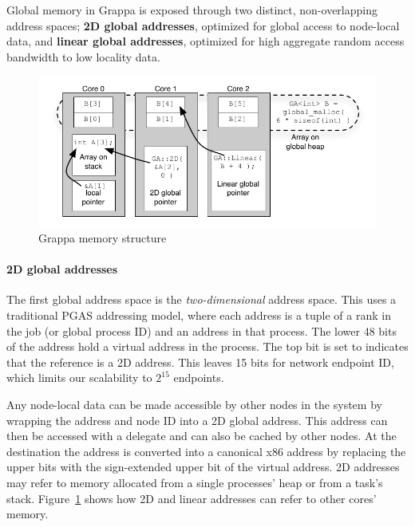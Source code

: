 Global memory in Grappa is exposed through two distinct, non-overlapping
address spaces; \textbf{2D global addresses}, optimized for global
access to node-local data, and \textbf{linear global addresses},
optimized for high aggregate random access bandwidth to low locality
data.


\begin{figure}[t]
\begin{center}
  \includegraphics[width=0.95\columnwidth]{figs/memory-structure}
\begin{minipage}{0.95\columnwidth}
  \caption{\label{fig:memory-structure} Grappa memory structure}
\end{minipage}
\vspace{-3ex}
\end{center}
\end{figure}

\paragraph{2D global addresses} The first global address space is the {\em
two-dimensional} address space. This uses a traditional PGAS addressing model,
where each address is a tuple of a rank in the job (or global process ID) and
an address in that process. The lower 48 bits of the address hold a virtual
address in the process. The top bit is set to indicates that the reference is
a 2D address. This leaves 15 bits for network endpoint ID, which limits our
scalability to $2^{15}$ endpoints.

Any node-local data can be made accessible by other nodes in the system
by wrapping the address and node ID into a 2D global address. This
address can then be accessed with a delegate and can also be cached by
other nodes. At the destination the address is converted into a
canonical x86 address by replacing the upper bits with the sign-extended
upper bit of the virtual address. 2D addresses may refer to memory
allocated from a single processes' heap or from a task's stack.
Figure~\ref{fig:memory-structure} shows how 2D and linear addresses can
refer to other cores' memory.

